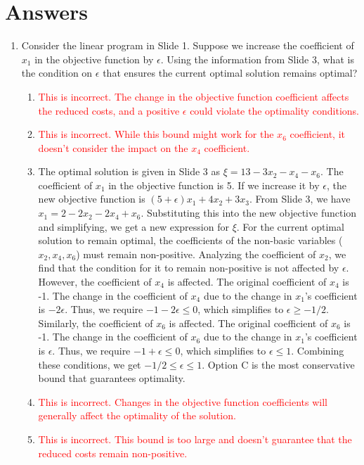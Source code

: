 \documentclass{article}%
\newcommand{\incorrect}[1]{\textcolor{red}{#1}}
\begin{document}
\section{Answers}%
\label{sec:Answers}%
\begin{enumerate}%
\item Consider the linear program in Slide 1.  Suppose we increase the coefficient of $x_1$ in the objective function by $\epsilon$. Using the information from Slide 3, what is the condition on $\epsilon$ that ensures the current optimal solution remains optimal?%
\begin{enumerate}%
\item \incorrect{This is incorrect.  The change in the objective function coefficient affects the reduced costs, and a positive $\epsilon$ could violate the optimality conditions.}%
\item \incorrect{This is incorrect.  While this bound might work for the $x_6$ coefficient, it doesn't consider the impact on the $x_4$ coefficient.}%
\item The optimal solution is given in Slide 3 as $\xi = 13 - 3x_2 - x_4 - x_6$. The coefficient of $x_1$ in the objective function is 5. If we increase it by $\epsilon$, the new objective function is $(5+\epsilon)x_1 + 4x_2 + 3x_3$.  From Slide 3, we have $x_1 = 2 - 2x_2 - 2x_4 + x_6$.  Substituting this into the new objective function and simplifying, we get a new expression for $\xi$. For the current optimal solution to remain optimal, the coefficients of the non-basic variables ($x_2, x_4, x_6$) must remain non-positive.  Analyzing the coefficient of $x_2$, we find that the condition for it to remain non-positive is not affected by $\epsilon$. However, the coefficient of $x_4$ is affected. The original coefficient of $x_4$ is -1. The change in the coefficient of $x_4$ due to the change in $x_1$'s coefficient is $-2\epsilon$. Thus, we require $-1 - 2\epsilon \le 0$, which simplifies to $\epsilon \ge -1/2$. Similarly, the coefficient of $x_6$ is affected. The original coefficient of $x_6$ is -1. The change in the coefficient of $x_6$ due to the change in $x_1$'s coefficient is $\epsilon$. Thus, we require $-1 + \epsilon \le 0$, which simplifies to $\epsilon \le 1$. Combining these conditions, we get $-1/2 \le \epsilon \le 1$.  Option C is the most conservative bound that guarantees optimality.%
\item \incorrect{This is incorrect.  Changes in the objective function coefficients will generally affect the optimality of the solution.}%
\item \incorrect{This is incorrect. This bound is too large and doesn't guarantee that the reduced costs remain non-positive.}%

\end{enumerate}
\end{enumerate}
\end{document}
